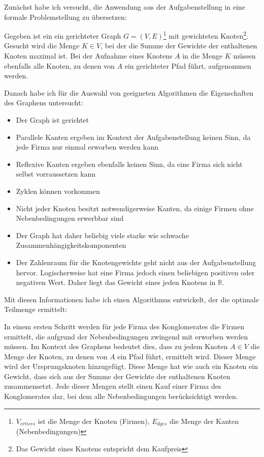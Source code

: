 Zunächst habe ich versucht, die Anwendung aus der Aufgabenstellung in eine formale Problemstellung zu übersetzen:
\begin{displayquote}
	Gegeben ist ein ein gerichteter Graph \(G=(V,E)\)\footnote{\(V_{ertices}\) ist die Menge der Knoten (Firmen), \(E_{dges}\) die Menge der Kanten (Nebenbedingungen)} mit gewichteten Knoten\footnote{Das Gewicht eines Knotens entspricht dem Kaufpreis}. Gesucht wird die Menge \(K \in V\), bei der die Summe der Gewichte der enthaltenen Knoten maximal ist. Bei der Aufnahme eines Knotens  \(A\) in die Menge \(K\) müssen ebenfalls alle Knoten, zu denen von \(A\) ein gerichteter Pfad führt, aufgenommen werden.
\end{displayquote}

Danach habe ich für die Auswahl von geeigneten Algorithmen die Eigenschaften des Graphens untersucht:
\begin{itemize}
	\item Der Graph ist gerichtet
	\item Parallele Kanten ergeben im Kontext der Aufgabenstellung keinen Sinn, da jede Firma nur einmal erworben werden kann
	\item Reflexive Kanten ergeben ebenfalls keinen Sinn, da eine Firma sich nicht selbst vorraussetzen kann
	\item Zyklen können vorkommen
	\item Nicht jeder Knoten besitzt notwendigerweise Kanten, da einige Firmen ohne Nebenbedingungen erwerbbar sind
	\item Der Graph hat daher beliebig viele starke wie schwache Zusammenhängigkeitskomponenten
	\item Der Zahlenraum für die Knotengewichte geht nicht aus der Aufgabenstellung hervor. Logischerweise hat eine Firma jedoch einen beliebigen positiven oder negativen Wert. Daher liegt das Gewicht eines jeden Knotens in \(\mathbb{R}\).
\end{itemize}

Mit diesen Informationen habe ich einen Algorithmus entwickelt, der die optimale Teilmenge ermittelt:

In einem ersten Schritt werden für jede Firma des Konglomerates die Firmen ermittelt, die aufgrund der Nebenbedingungen zwingend mit erworben werden müssen. Im Kontext des Graphens bedeutet dies, dass zu jedem Knoten \(A \in V\) die Menge der Knoten, zu denen von \(A\) ein Pfad führt, ermittelt wird. Dieser Menge wird der Ursprungsknoten hinzugefügt. Diese Menge hat wie auch ein Knoten ein Gewicht, dass sich aus der Summe der Gewichte der enthaltenen Knoten zusammensetzt. Jede dieser Mengen stellt einen Kauf einer Firma des Konglomerates dar, bei dem alle Nebenbedingungen berücksichtigt werden.

